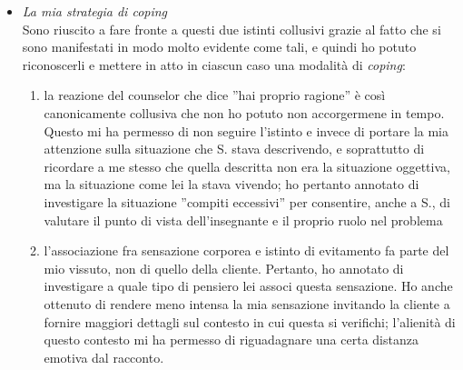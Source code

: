 \begin{itemize}
\item \textsl{La mia strategia di coping}\\
Sono riuscito a fare fronte a questi due istinti collusivi grazie al fatto che si sono manifestati in modo molto evidente come tali, e quindi ho potuto riconoscerli e mettere in atto in ciascun caso una modalità di \emph{coping}:
\begin{enumerate}
\item la reazione del counselor che dice ''hai proprio ragione'' è così canonicamente collusiva che non ho potuto non accorgermene in tempo. Questo mi ha permesso di non seguire l'istinto e invece di portare la mia attenzione sulla situazione che S. stava descrivendo, e soprattutto di ricordare a me stesso che quella descritta non era la situazione oggettiva, ma la situazione come lei la stava vivendo; ho pertanto annotato di investigare la situazione ''compiti eccessivi'' per consentire, anche a S., di valutare il punto di vista dell'insegnante e il proprio ruolo nel problema
\item l'associazione fra sensazione corporea e istinto di evitamento fa parte del mio vissuto,  non di quello della cliente. Pertanto, ho annotato di investigare a quale tipo di pensiero lei associ questa sensazione. Ho anche ottenuto di rendere meno intensa la mia sensazione invitando la cliente a fornire maggiori dettagli sul contesto in cui questa si verifichi; l'alienità di questo contesto mi ha permesso di riguadagnare una certa distanza emotiva dal racconto.
\end{enumerate}
\end{itemize}
